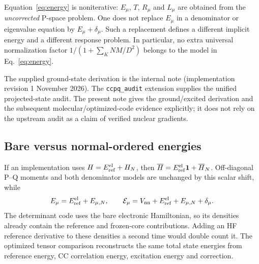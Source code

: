 \documentclass[11pt,letterpaper]{article}
\numberwithin{equation}{section}
\newcommand{\bH}{\overline H}
\begin{document}
Equation~\eqref{eq:energy} is noniterative: $E_\mu$, $T$, $R_\mu$ and $L_\mu$
are obtained from the \emph{uncorrected} P-space problem. One does not replace
$E_\mu$ in a denominator or eigenvalue equation by $E_\mu+\delta_\mu$.
Such a replacement defines a different implicit energy and a different
response problem. In particular, no extra universal normalization factor
$1/(1+\sum_K NM/D^2)$ belongs to the model in Eq.~\eqref{eq:energy}.

The supplied ground-state derivation is the internal note
 (implementation revision
1 November 2026). The \texttt{ccpq\_audit} extension supplies the unified
projected-state audit. The present note gives the ground/excited derivation
and the subsequent molecular/optimized-code evidence explicitly; it does not
rely on the upstream audit as a claim of verified nuclear gradients.

\subsection{Bare versus normal-ordered energies}
If an implementation uses $H=E_{\rm ref}^{\rm el}+H_N$, then
$\bH=E_{\rm ref}^{\rm el}\mathbf 1+\overline H_N$. Off-diagonal P--Q moments
and both denominator models are unchanged by this scalar shift, while
\begin{equation}
 E_\mu=E_{\rm ref}^{\rm el}+E_{\mu,N},\qquad
 \mathcal E_\mu=V_{\rm nn}+E_{\rm ref}^{\rm el}+E_{\mu,N}+\delta_\mu.
\end{equation}
The determinant code uses the bare electronic Hamiltonian, so its densities
already contain the reference and frozen-core contributions. Adding an HF
reference derivative to these densities a second time would double count it.
The optimized tensor comparison reconstructs the same total state energies
from reference energy, CC correlation energy, excitation energy and correction.
\end{document}
